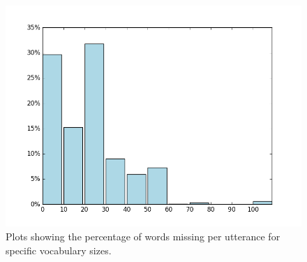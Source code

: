 \begin{figure}[H]
	\centering
	\small
	\endminipage\hfill
	\includegraphics[width=\linewidth]{img/opus_vocab_analyze_25k_perc.PNG}
	\centering
	\small
	\endminipage
	\caption{Plots showing the percentage of words missing per utterance for specific vocabulary sizes.}
	\label{fig:data:reddit:vocab:analyze}
\end{figure}

